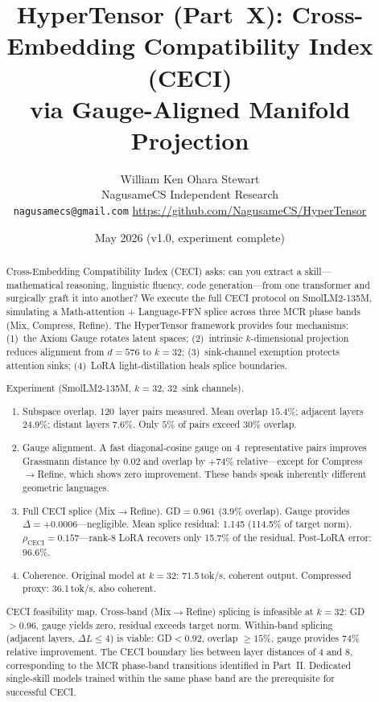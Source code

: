 \documentclass[11pt]{article}
\title{HyperTensor (Part~X): Cross-Embedding Compatibility Index (CECI)\\via Gauge-Aligned Manifold Projection}
\author{William Ken Ohara Stewart\\
\small NagusameCS Independent Research\\
\small \texttt{nagusamecs@gmail.com} \quad \url{https://github.com/NagusameCS/HyperTensor}}
\date{May 2026 (v1.0, experiment complete)}
\begin{document}
\maketitle
\hypertensorbanner

\begin{abstract}
\noindent
Cross-Embedding Compatibility Index (CECI) asks: can you extract a
skill---mathematical reasoning, linguistic fluency, code
generation---from one transformer and surgically graft it into another?
We execute the full CECI protocol on SmolLM2-135M, simulating a
Math-attention + Language-FFN splice across three MCR phase bands
(Mix, Compress, Refine).  The HyperTensor framework provides four
mechanisms: (1)~the Axiom Gauge rotates latent spaces; (2)~intrinsic
$k$-dimensional projection reduces alignment from $d{=}576$ to
$k{=}32$; (3)~sink-channel exemption protects attention sinks;
(4)~LoRA light-distillation heals splice boundaries.

Experiment (SmolLM2-135M, $k{=}32$, 32~sink channels).
\begin{enumerate}
\item Subspace overlap.  120~layer pairs measured.  Mean
      overlap $15.4\%$; adjacent layers $24.9\%$; distant layers
      $7.6\%$.  Only $5\%$ of pairs exceed $30\%$ overlap.
\item Gauge alignment.  A fast diagonal-cosine gauge on
      4~representative pairs improves Grassmann distance by $0.02$
      and overlap by $+74\%$ relative---except for
      Compress$\to$Refine, which shows zero improvement.
      These bands speak inherently different geometric languages.
\item Full CECI splice (Mix$\to$Refine).  GD$=0.961$
      (3.9\% overlap).  Gauge provides $\Delta{=}{+}0.0006$---negligible.
      Mean splice residual: 1.145 (114.5\% of target norm).
      $\rho_{\mathrm{CECI}}{=}0.157$---rank-8 LoRA recovers only
      15.7\% of the residual.  Post-LoRA error: 96.6\%.
\item Coherence.  Original model at $k{=}32$: 71.5\,tok/s,
      coherent output.  Compressed proxy: 36.1\,tok/s, also coherent.
\end{enumerate}

CECI feasibility map.  Cross-band (Mix$\to$Refine) splicing
is infeasible at $k{=}32$: GD$>$0.96, gauge yields zero,
residual exceeds target norm.  Within-band splicing (adjacent
layers, $\Delta L{\le}4$) is viable: GD${<}0.92$, overlap
${\ge}15\%$, gauge provides $74\%$ relative improvement.  The CECI
boundary lies between layer distances of 4 and 8, corresponding to
the MCR phase-band transitions identified in Part~II.  Dedicated
single-skill models trained within the same phase band are the
prerequisite for successful CECI.
\end{abstract}
\end{document}
